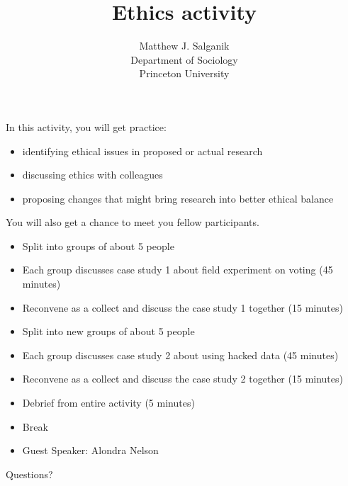 \documentclass{beamer}
\title[]{Ethics activity}
\author[]{Matthew J. Salganik\\Department of Sociology\\Princeton University}
\date[]{Summer Institutes in Computational Social Science\\June 17, 2019
\vfill
\begin{flushleft}
{\scriptsize
The Summer Institute in Computational Social Science is supported by grants from the Russell Sage Foundation and the Alfred P. Sloan Foundation.}
\end{flushleft}
\begin{flushright}
\vspace{0.1in}
\texttt{[image: figures/cc-by.png]}
\end{flushright}
}
\begin{document}
\frame{\titlepage}
\begin{frame}

In this activity, you will get practice:
\begin{itemize}
\item identifying ethical issues in proposed or actual research
\pause
\item discussing ethics with colleagues
\pause
\item proposing changes that might bring research into better ethical balance
\end{itemize}
\pause
\vfill
You will also get a chance to meet you fellow participants.

\end{frame}
\begin{frame}

\begin{itemize}
\item Split into groups of about 5 people
\pause
\item Each group discusses case study 1 about field experiment on voting (45 minutes)
\pause
\item Reconvene as a collect and discuss the case study 1 together (15 minutes)
\pause
\item Split into new groups of about 5 people
\pause
\item Each group discusses case study 2 about using hacked data (45 minutes)
\pause
\item Reconvene as a collect and discuss the case study 2 together (15 minutes)
\pause
\item Debrief from entire activity (5 minutes)
\pause
\item Break
\pause
\item Guest Speaker: Alondra Nelson
\end{itemize}

\end{frame}
\begin{frame}

\begin{center}
\LARGE
Questions?
\end{center}

\end{frame}
\end{document}
